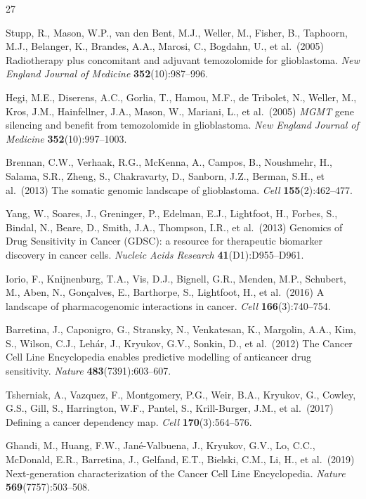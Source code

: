 \documentclass{article}
\begin{document}
\begin{thebibliography}{27}

Stupp, R., Mason, W.P., van den Bent, M.J., Weller, M., Fisher, B., Taphoorn, M.J., Belanger, K., Brandes, A.A., Marosi, C., Bogdahn, U., et al.\ (2005)
Radiotherapy plus concomitant and adjuvant temozolomide for glioblastoma.
\emph{New England Journal of Medicine} \textbf{352}(10):987--996.

Hegi, M.E., Diserens, A.C., Gorlia, T., Hamou, M.F., de Tribolet, N., Weller, M., Kros, J.M., Hainfellner, J.A., Mason, W., Mariani, L., et al.\ (2005)
\emph{MGMT} gene silencing and benefit from temozolomide in glioblastoma.
\emph{New England Journal of Medicine} \textbf{352}(10):997--1003.

Brennan, C.W., Verhaak, R.G., McKenna, A., Campos, B., Noushmehr, H., Salama, S.R., Zheng, S., Chakravarty, D., Sanborn, J.Z., Berman, S.H., et al.\ (2013)
The somatic genomic landscape of glioblastoma.
\emph{Cell} \textbf{155}(2):462--477.

Yang, W., Soares, J., Greninger, P., Edelman, E.J., Lightfoot, H., Forbes, S., Bindal, N., Beare, D., Smith, J.A., Thompson, I.R., et al.\ (2013)
Genomics of Drug Sensitivity in Cancer (GDSC): a resource for therapeutic biomarker discovery in cancer cells.
\emph{Nucleic Acids Research} \textbf{41}(D1):D955--D961.

Iorio, F., Knijnenburg, T.A., Vis, D.J., Bignell, G.R., Menden, M.P., Schubert, M., Aben, N., Gon{\c{c}}alves, E., Barthorpe, S., Lightfoot, H., et al.\ (2016)
A landscape of pharmacogenomic interactions in cancer.
\emph{Cell} \textbf{166}(3):740--754.

Barretina, J., Caponigro, G., Stransky, N., Venkatesan, K., Margolin, A.A., Kim, S., Wilson, C.J., Leh{\'a}r, J., Kryukov, G.V., Sonkin, D., et al.\ (2012)
The Cancer Cell Line Encyclopedia enables predictive modelling of anticancer drug sensitivity.
\emph{Nature} \textbf{483}(7391):603--607.

Tsherniak, A., Vazquez, F., Montgomery, P.G., Weir, B.A., Kryukov, G., Cowley, G.S., Gill, S., Harrington, W.F., Pantel, S., Krill-Burger, J.M., et al.\ (2017)
Defining a cancer dependency map.
\emph{Cell} \textbf{170}(3):564--576.

Ghandi, M., Huang, F.W., Jan{\'e}-Valbuena, J., Kryukov, G.V., Lo, C.C., McDonald, E.R., Barretina, J., Gelfand, E.T., Bielski, C.M., Li, H., et al.\ (2019)
Next-generation characterization of the Cancer Cell Line Encyclopedia.
\emph{Nature} \textbf{569}(7757):503--508.


\end{thebibliography}
\end{document}
